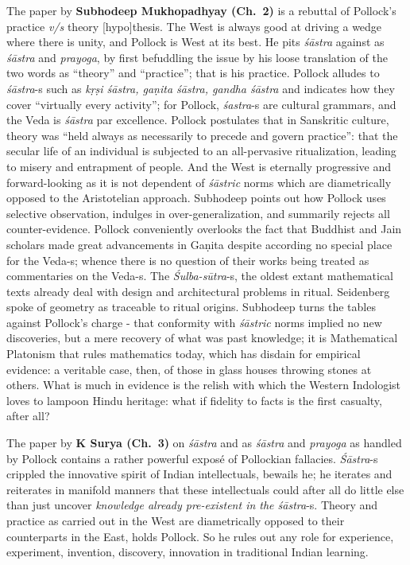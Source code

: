 The paper by {\bf Subhodeep Mukhopadhyay (Ch.~2)} is a rebuttal of Pollock’s practice {\sl v/s} theory [hypo]thesis. The West is always good at driving a wedge where there is unity, and Pollock is West at its best. He pits {\sl śāstra} against as {\sl śāstra} and {\sl prayoga}, by first befuddling the issue by his loose translation of the two words as “theory” and “practice”; that is his practice. Pollock alludes to {\sl śāstra}-s such as {\sl kṛṣi śāstra, gaṇita śāstra, gandha śāstra} and indicates how they cover “virtually every activity”; for Pollock, {\sl śastra}-s are cultural grammars, and the Veda is {\sl śāstra} par excellence. Pollock postulates that in Sanskritic culture, theory was “held always as necessarily to precede and govern practice'': that the secular life of an individual is subjected to an all-pervasive ritualization, leading to misery and entrapment of people. And the West is eternally progressive and forward-looking as it is not dependent of {\sl śāstric} norms which are diametrically opposed to the Aristotelian approach. Subhodeep points out how Pollock uses selective observation, indulges in over-generalization, and summarily rejects all counter-evidence. Pollock conveniently overlooks the fact that Buddhist and Jain scholars made great advancements in Gaṇita despite according no special place for the Veda-s; whence there is no question of their works being treated as commentaries on the Veda-s. The {\sl Śulba-sūtra}-s, the oldest extant mathematical texts already deal with design and architectural problems in ritual. Seidenberg spoke of geometry as traceable to ritual origins. Subhodeep turns the tables against Pollock’s charge - that conformity with {\sl śāstric} norms implied no new discoveries, but a mere recovery of what was past knowledge; it is Mathematical Platonism that rules mathematics today, which has disdain for empirical evidence: a veritable case, then, of those in glass houses throwing stones at others. What is much in evidence is the relish with which the Western Indologist loves to lampoon Hindu heritage: what if fidelity to facts is the first casualty, after all?

The paper by {\bf K Surya (Ch.~3)} on {\sl śāstra} and as {\sl śāstra} and {\sl prayoga} as handled by Pollock contains a rather powerful exposé of Pollockian fallacies. {\sl Śāstra}-s crippled the innovative spirit of Indian intellectuals, bewails he; he iterates and reiterates in manifold manners that these intellectuals could after all do little else than just uncover {\sl knowledge already pre-existent in the śāstra}-s. Theory and practice as carried out in the West are diametrically opposed to their counterparts in the East, holds Pollock. So he rules out any role for experience, experiment, invention, discovery, innovation in traditional Indian learning.

